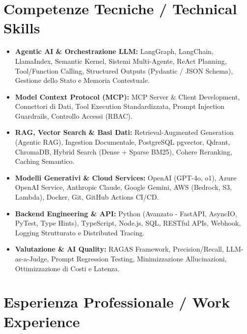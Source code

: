 \documentclass[a4paper,10pt]{article}
\begin{document}
\section{Competenze Tecniche / Technical Skills}
\begin{itemize}[leftmargin=1.2em, itemsep=2pt]
  \item \textbf{Agentic AI \& Orchestrazione LLM:} LangGraph, LangChain, LlamaIndex, Semantic Kernel, Sistemi Multi-Agente, ReAct Planning, Tool/Function Calling, Structured Outputs (Pydantic / JSON Schema), Gestione dello Stato e Memoria Contestuale.
  \item \textbf{Model Context Protocol (MCP):} MCP Server \& Client Development, Connettori di Dati, Tool Execution Standardizzata, Prompt Injection Guardrails, Controllo Accessi (RBAC).
  \item \textbf{RAG, Vector Search \& Basi Dati:} Retrieval-Augmented Generation (Agentic RAG), Ingestion Documentale, PostgreSQL pgvector, Qdrant, ChromaDB, Hybrid Search (Dense + Sparse BM25), Cohere Reranking, Caching Semantico.
  \item \textbf{Modelli Generativi \& Cloud Services:} OpenAI (GPT-4o, o1), Azure OpenAI Service, Anthropic Claude, Google Gemini, AWS (Bedrock, S3, Lambda), Docker, Git, GitHub Actions CI/CD.
  \item \textbf{Backend Engineering \& API:} Python (Avanzato - FastAPI, AsyncIO, PyTest, Type Hints), TypeScript, Node.js, SQL, RESTful APIs, Webhook, Logging Strutturato e Distributed Tracing.
  \item \textbf{Valutazione \& AI Quality:} RAGAS Framework, Precision/Recall, LLM-as-a-Judge, Prompt Regression Testing, Minimizzazione Allucinazioni, Ottimizzazione di Costi e Latenza.
\end{itemize}

\section{Esperienza Professionale / Work Experience}
\end{document}
